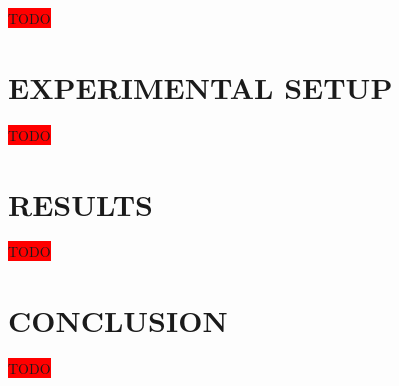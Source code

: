 \documentclass[letter, 12pt, conference]{ieeeconf}
\newcommand{\todo}{\colorbox{red}{TODO}}
\begin{document}
\todo

\section{EXPERIMENTAL SETUP}

\todo

\section{RESULTS}

\todo

\section{CONCLUSION}

\todo



\printbibliography
\end{document}
